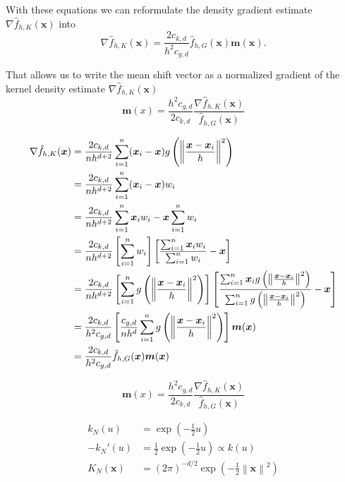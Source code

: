 \documentclass{article}
\newcommand{\norm}[1]{\left\lVert#1\right\rVert}
\begin{document}
With these equations we can reformulate the density gradient estimate $\nabla \hat{f}_{h,K}(\bm{x})$ into
\begin{equation}
	\nabla \hat{f}_{h,K}(\bm{x}) = \frac{2c_{k,d}}{h^2c_{g,d}} \hat{f}_{h,G}(\bm{x}) \bm{m}(\bm{x})\text{.}
\end{equation}

That allows us to write the mean shift vector as a normalized gradient of the kernel density estimate $\nabla \hat{f}_{h,K}(\bm{x})$
\begin{equation}
	\bm{m}(x) = \frac{h^2c_{g,d}}{2c_{k,d}} \frac{\nabla \hat{f}_{h,K}(\bm{x})}{\hat{f}_{h,G}(\bm{x})}
\end{equation}


\begin{align}
	\nabla \hat{f}_{h,K}(\bm{x}) &= \frac{2c_{k,d}}{nh^{d+2}} \sum_{i=1}^n (\bm{x}_i - \bm{x})g\left(\norm{\frac{\bm{x} - \bm{x}_i}{h}}^2 \right)\notag\\
	&= \frac{2c_{k,d}}{nh^{d+2}} \sum_{i=1}^n (\bm{x}_i - \bm{x}) w_i\notag\\
	&= \frac{2c_{k,d}}{nh^{d+2}} \sum_{i=1}^n \bm{x}_i w_i - \bm{x} \sum_{i=1}^n w_i\notag\\
	&= \frac{2c_{k,d}}{nh^{d+2}} \left[\sum_{i=1}^n w_i\right] \left[\frac{\sum_{i=1}^n \bm{x}_i w_i}{\sum_{i=1}^n w_i} - \bm{x}\right]\notag\\
	&= \frac{2c_{k,d}}{nh^{d+2}} \left[\sum_{i=1}^n g\left(\norm{\frac{\bm{x} - \bm{x}_i}{h}}^2 \right)\right] \left[\frac{\sum_{i=1}^n \bm{x}_i g\left(\norm{\frac{\bm{x} - \bm{x}_i}{h}}^2 \right)}{\sum_{i=1}^n g\left(\norm{\frac{\bm{x} - \bm{x}_i}{h}}^2 \right)} - \bm{x}\right]\notag\\
	&= \frac{2c_{k,d}}{h^2c_{g,d}} \left[\frac{c_{g,d}}{nh^d} \sum_{i=1}^n g\left(\norm{\frac{\bm{x} - \bm{x}_i}{h}}^2 \right) \right] \bm{m}(\bm{x})\notag\\
	&= \frac{2c_{k,d}}{h^2c_{g,d}} \hat{f}_{h,G}(\bm{x}) \bm{m}(\bm{x})\notag
\end{align}


\begin{equation}
	\bm{m}(x) = \frac{h^2c_{g,d}}{2c_{k,d}} \frac{\nabla \hat{f}_{h,K}(\bm{x})}{\hat{f}_{h,G}(\bm{x})}
\end{equation}

\begin{align}
	k_N(u) &= \exp\left(-\frac{1}{2}u\right)\\
	-k_N'(u) &= \frac{1}{2}\exp\left(-\frac{1}{2}u\right) \propto k(u)\\
	K_N(\bm{x}) &= (2\pi)^{-d/2} \exp\left(-\frac{1}{2}\norm{\bm{x}}^2\right)
\end{align}
\end{document}
